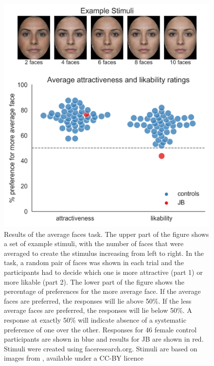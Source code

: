\documentclass[fleqn,10pt]{SelfArx} %
\begin{document}
\begin{figure}[htbp]
	
	\renewcommand{\familydefault}{\sfdefault}\normalfont
	\centering
	\includegraphics[width=\columnwidth]{../reports/figures/attract_main_figure.png}
	\vspace*{-3mm}
 		\caption{Results of the average faces task. The upper part of the figure shows a set of example stimuli, with the number of faces that were averaged to create the stimulus increasing from left to right. In the task, a random pair of faces was shown in each trial and the participants had to decide which one is more attractive (part 1) or more likable (part 2). The lower part of the figure shows the percentage of preferences for the more average face. If the average faces are preferred, the responses will lie above 50\%. If the less average faces are preferred, the responses will lie below 50\%. A response at exactly 50\% will indicate absence of a systematic preference of one over the other. Responses for 46 female control participants are shown in blue and results for JB are shown in red. Stimuli were created using faceresearch.org. Stimuli are based on images from \citet{DeBruine2017}, available under a CC-BY licence}%
 		\label{fig:attract}
\end{figure}
\end{document}
